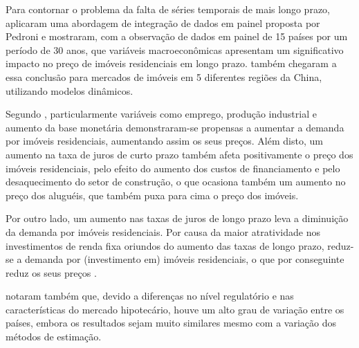 \documentclass[
	12pt,				%
	oneside,			%
	a4paper,			%
	chapter=TITLE,		%
	section=TITLE,		%
	english,			%
	brazil				%
	]{abntex2}
\begin{document}
Para contornar o problema da falta de séries temporais de mais longo prazo,
\textcite{ADAMS2010} aplicaram uma abordagem de integração de dados em painel proposta por
Pedroni e mostraram, com a observação de dados em painel de 15 países por um
período de 30 anos, que variáveis macroeconômicas apresentam um significativo
impacto no preço de imóveis residenciais em longo prazo. \textcite[p.~51]{FAN201937}
também chegaram a essa conclusão para mercados de imóveis em 5 diferentes
regiões da China, utilizando modelos dinâmicos.

Segundo \textcite[p.~18]{ADAMS2010}, particularmente variáveis como emprego, produção
industrial e aumento da base monetária demonstraram-se propensas a aumentar a
demanda por imóveis residenciais, aumentando assim os seus preços. Além disto,
um aumento na taxa de juros de curto prazo também afeta positivamente o preço
dos imóveis residenciais, pelo efeito do aumento dos custos de financiamento e
pelo desaquecimento do setor de construção, o que ocasiona também um aumento no
preço dos aluguéis, que também puxa para cima o preço dos imóveis.

Por outro lado, um aumento nas taxas de juros de longo prazo leva a diminuição
da demanda por imóveis residenciais. Por causa da maior atratividade nos
investimentos de renda fixa oriundos do aumento das taxas de longo prazo,
reduz-se a demanda por (investimento em) imóveis residenciais, o que
por conseguinte reduz os seus preços \autocite[19]{ADAMS2010}.

\textcite{ADAMS2010} notaram também que, devido a diferenças no nível regulatório e nas
características do mercado hipotecário, houve um alto grau de variação entre os
países, embora os resultados sejam muito similares mesmo com a variação dos
métodos de estimação.
\end{document}
